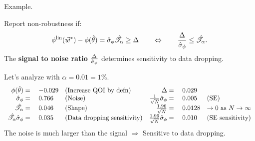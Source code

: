 
\begin{frame}[t]{Example.}

Report non-robustness if:
%
\begin{align*}
%
\thetafunlin(\w^*) - \thetafun(\thetahat)  = \noise \shape \ge \Delta
\quad\quad
\Leftrightarrow
\quad\quad
\frac{\Delta}{\noise} \le \shape.
%
\end{align*}
%
The \textbf{signal to noise ratio} $\frac{\Delta}{\hat\sigma_{\phi}}$
determines sensitivity to data dropping.

\hrulefill

\vspace{-1em}
Let's analyze with $\alpha = 0.01 = 1\%$.
%
\begin{align*}
%
\begin{array}{rllrll}
\thetafun(\thetahat) ={}& -0.029  &\textrm{(Increase QOI by defn)}
    &   \Delta ={}& 0.029 \\
\noise ={}& 0.766 & \textrm{(Noise)}
        & \frac{1}{\sqrt{N}} \noise ={}& 0.005 &
        \textrm{(SE)} \\
\shape ={}& 0.046   &   \textrm{(Shape)}
    & \frac{1.96}{\sqrt{N}}  ={}& 0.0128
    & \rightarrow 0 \textrm{ as }N \rightarrow \infty\\
\shape \noise ={}& 0.035 & \textrm{(Data dropping sensitivity)}
    & \frac{1.96}{\sqrt{N}} \noise  ={}& 0.010
    & \textrm{(SE sensitivity)}\\
\end{array}
\end{align*}
%
The noise is much larger than the signal $\Rightarrow$
Sensitive to data dropping.

\end{frame}



